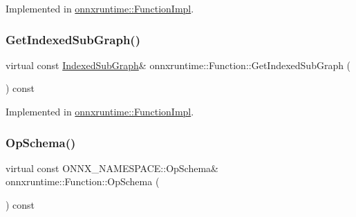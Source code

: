 Implemented in \mbox{\hyperlink{classonnxruntime_1_1FunctionImpl_a97e5a25ac521423dbe59501f6b7fd2c1}{onnxruntime\+::\+Function\+Impl}}.

\mbox{\label{classonnxruntime_1_1Function_a017f5155e74c32b1e3cd42e6c0f94d91}} 
\subsubsection{\texorpdfstring{Get\+Indexed\+Sub\+Graph()}{GetIndexedSubGraph()}\hspace{0.1cm}{\footnotesize\ttfamily [2/2]}}
{\footnotesize\ttfamily virtual const \mbox{\hyperlink{structonnxruntime_1_1IndexedSubGraph}{Indexed\+Sub\+Graph}}\& onnxruntime\+::\+Function\+::\+Get\+Indexed\+Sub\+Graph (\begin{DoxyParamCaption}{ }\end{DoxyParamCaption}) const\hspace{0.3cm}{\ttfamily [pure virtual]}}



Implemented in \mbox{\hyperlink{classonnxruntime_1_1FunctionImpl_a97e5a25ac521423dbe59501f6b7fd2c1}{onnxruntime\+::\+Function\+Impl}}.

\mbox{\label{classonnxruntime_1_1Function_aad1b1f67422088275cb4ce6470aa906a}} 
\subsubsection{\texorpdfstring{Op\+Schema()}{OpSchema()}\hspace{0.1cm}{\footnotesize\ttfamily [1/2]}}
{\footnotesize\ttfamily virtual const O\+N\+N\+X\+\_\+\+N\+A\+M\+E\+S\+P\+A\+C\+E\+::\+Op\+Schema\& onnxruntime\+::\+Function\+::\+Op\+Schema (\begin{DoxyParamCaption}{ }\end{DoxyParamCaption}) const\hspace{0.3cm}{\ttfamily [pure virtual]}}




